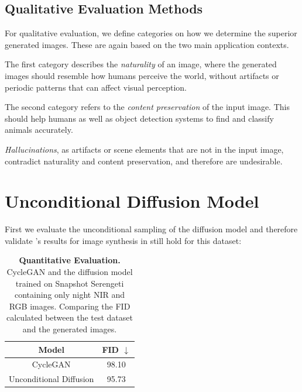
\label{sec:evaluate-fid}

\subsection{Qualitative Evaluation Methods}
For qualitative evaluation, we define categories on how we determine the superior generated images. These are again based on the two main application contexts.

The first category describes the \textit{naturality} of an image, where the generated images should resemble how humans perceive the world, without artifacts or periodic patterns that can affect visual perception.

The second category refers to the \textit{content preservation} of the input image. This should help humans as well as object detection systems to find and classify animals accurately.

\textit{Hallucinations}, as artifacts or scene elements that are not in the input image, contradict naturality and content preservation, and therefore are undesirable.

\section{Unconditional Diffusion Model}
\label{sec:unconditional-diffusion-sampling-evaluation}
First we evaluate the unconditional sampling of the diffusion model and therefore validate \parencite{diffusion-beats-gans}'s results for image synthesis in still hold for this dataset:

\begin{table}[htp!]
    \centering
    \begin{tabular}{c | c}
        Model                   & FID  $\downarrow$ \\
        \hline\hline
        CycleGAN                & 98.10             \\
        Unconditional Diffusion & 95.73
    \end{tabular}
    \caption{
        \textbf{Quantitative Evaluation.} CycleGAN and the diffusion model trained on Snapshot Serengeti \parencite{serengeti} containing only night NIR and RGB images.
        Comparing the FID calculated between the test dataset and the generated images.
    }
    \label{fig:quantitative-evaluation-unconditional-sampling}
\end{table}

